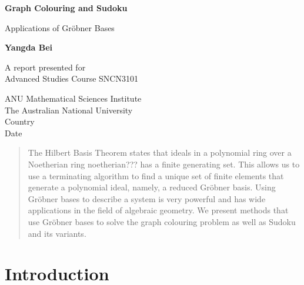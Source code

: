 \documentclass[11pt]{article}
\theoremstyle{definition}
\begin{document}
    \begin{titlepage}
        \begin{center}
            \vspace*{1cm}
     
            \textbf{Graph Colouring and Sudoku}
     
            \vspace{0.5cm}
             Applications of Gr\"obner Bases
                 
            \vspace{1.5cm}
     
            \textbf{Yangda Bei}
                 
            A report presented for \\
            Advanced Studies Course SNCN3101
                 
            \vspace{0.8cm}

                 
            ANU Mathematical Sciences Institute\\
            The Australian National University\\
            Country\\
            Date
                 
        \end{center}
    \end{titlepage}

    \begin{abstract}
        \centering
        The Hilbert Basis Theorem states that ideals in a polynomial ring over a Noetherian ring {\color{red} noetherian???} has a finite generating set. This allows us to use a terminating algorithm to find a unique set of finite elements that generate a polynomial ideal, namely, a reduced Gr\"obner basis. Using Gr\"obner bases to describe a system is very powerful and has wide applications in the field of algebraic geometry. We present methods that use Gr\"obner bases to solve the graph colouring problem as well as Sudoku and its variants.
    \end{abstract}
    

    \tableofcontents
    \pagebreak
    
    \section{Introduction}

    
\end{document}
